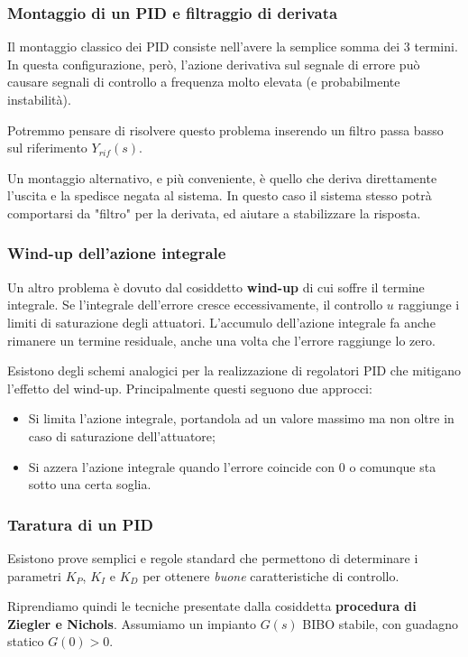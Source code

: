 \documentclass[a4paper,11pt]{article}
\begin{document}
\subsubsection{Montaggio di un PID e filtraggio di derivata}
Il montaggio classico dei PID consiste nell'avere la semplice somma dei 3 termini.
In questa configurazione, però, l'azione derivativa sul segnale di errore può causare segnali di controllo a frequenza molto elevata (e probabilmente instabilità).

Potremmo pensare di risolvere questo problema inserendo un filtro passa basso sul riferimento $Y_{rif}(s)$.

Un montaggio alternativo, e più conveniente, è quello che deriva direttamente l'uscita e la spedisce negata al sistema.
In questo caso il sistema stesso potrà comportarsi da "filtro" per la derivata, ed aiutare a stabilizzare la risposta.

\subsubsection{Wind-up dell'azione integrale}
Un altro problema è dovuto dal cosiddetto \textbf{wind-up} di cui soffre il termine integrale.
Se l'integrale dell'errore cresce eccessivamente, il controllo $u$ raggiunge i limiti di saturazione degli attuatori.
L'accumulo dell'azione integrale fa anche rimanere un termine residuale, anche una volta che l'errore raggiunge lo zero.

Esistono degli schemi analogici per la realizzazione di regolatori PID che mitigano l'effetto del wind-up.
Principalmente questi seguono due approcci:
\begin{itemize}
	\item Si limita l'azione integrale, portandola ad un valore massimo ma non oltre in caso di saturazione dell'attuatore;
	\item Si azzera l'azione integrale quando l'errore coincide con 0 o comunque sta sotto una certa soglia.
\end{itemize}

\subsubsection{Taratura di un PID}
Esistono prove semplici e regole standard che permettono di determinare i parametri $K_P$, $K_I$ e $K_D$ per ottenere \textit{buone} caratteristiche di controllo.

Riprendiamo quindi le tecniche presentate dalla cosiddetta \textbf{procedura di Ziegler e Nichols}.
Assumiamo un impianto $G(s)$ BIBO stabile, con guadagno statico $G(0) > 0$.
\end{document}
